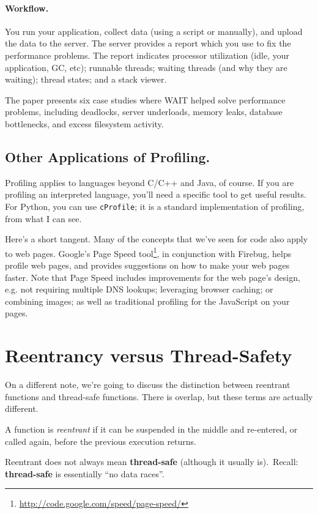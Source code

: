 \documentclass[11pt]{article}
\begin{document}
\paragraph{Workflow.} You run your application, collect data (using a
script or manually), and upload the data to the server. The server provides
a report which you use to fix the performance problems.
The report indicates processor utilization (idle, your application, GC, 
etc); runnable threads; waiting threads (and why they are waiting); 
thread states; and a stack viewer.

The paper presents six case studies where WAIT helped solve performance
problems, including deadlocks, server underloads, memory leaks, database
bottlenecks, and excess filesystem activity.

\subsection*{Other Applications of Profiling.} 
Profiling applies to languages beyond C/C++ and Java, of course. If you are
profiling an interpreted language, you'll need a specific tool to get useful
results. For Python, you can use {\tt cProfile}; it is a standard implementation
of profiling, from what I can see.


Here's a short tangent. Many of the concepts that we've seen for code
also apply to web pages. Google's Page Speed
tool\footnote{\url{http://code.google.com/speed/page-speed/}}, in
conjunction with Firebug, helps profile web pages, and provides
suggestions on how to make your web pages faster. Note that Page Speed
includes improvements for the web page's design, e.g. not requiring
multiple DNS lookups; leveraging browser caching; or combining images;
as well as traditional profiling for the JavaScript on your pages.

\newpage
\section*{Reentrancy versus Thread-Safety}
On a different note, we're going to discuss the distinction between reentrant functions
and thread-safe functions. There is overlap, but these terms are actually different.

A function is \emph{reentrant} if it can be suspended in the middle
and re-entered, or called again, before the previous execution
returns.
    
Reentrant does not always mean {\bf thread-safe} (although it usually is).\
Recall: {\bf thread-safe} is essentially ``no data races''.
\end{document}
